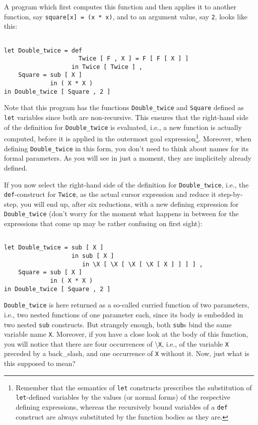 A \kir program which first computes this function and then
applies it to another function, say {\tt square[x] = (x * x)},
and to an argument value, say {\tt 2}, looks like this:
\begin{verbatim}

let Double_twice = def 
                     Twice [ F , X ] = F [ F [ X ] ]
                   in Twice [ Twice ] ,
    Square = sub [ X ]
             in ( X * X )
in Double_twice [ Square , 2 ]

\end{verbatim}
Note that this program has
the functions {\tt Double\_twice} and {\tt Square} defined
as {\tt let} variables since both are
non-recursive. This ensures that the right-hand side
of the definition for {\tt Double\_twice} is evaluated, i.e., a new
 function is actually computed, before it is applied in the outermost
 goal expression\footnote{Remember that the semantics of {\tt let} constructs
prescribes the substitution of {\tt let}-defined variables
 by the {\mys values} (or {\mys normal forms}) 
of the respective defining expressions, whereas the recursively
bound variables of a {\tt def}
construct are always substituted by the function bodies as they are.}. 
Moreover, when defining {\tt Double\_twice} in this form,
you don't need to think about names for its formal parameters. As
you will see in just a moment, they are implicitely already defined. 

If you now select the right-hand side of the definition for
{\tt Double\_twice}, i.e., the {\tt def}-construct for {\tt Twice},
as the actual cursor expression and reduce it step-by-step, you
 will end up, after six reductions, with a new defining expression for {\tt Double\_twice}
(don't worry for the moment what happens in between for the expressions
that come up may be rather confusing on first sight):
\begin{verbatim}

let Double_twice = sub [ X ]
                   in sub [ X ]
                      in \X [ \X [ \X [ \X [ X ] ] ] ] ,
    Square = sub [ X ]
             in ( X * X )
in Double_twice [ Square , 2 ]

\end{verbatim}
{\tt Double\_twice} is here returned as
 a so-called {\mys curried function} of two parameters, i.e.,
two nested functions of one parameter each,  since its body is embedded
in two nested {\tt sub} constructs. But strangely enough, both {\tt sub}s
bind the same variable name {\tt X}. Moreover, if you have a close look at the
 body of this function,
you will notice that there are four occurrences of {\tt $\setminus$X}, i.e., of
the variable {\tt X} preceded by a {\mys back\_slash}, and one occurrence of
{\tt X} without it. Now, just what is this supposed to mean? 


